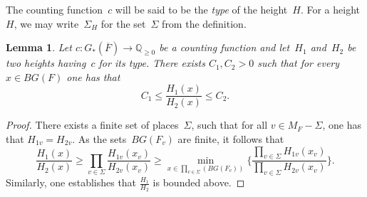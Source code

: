 \documentclass[a4paper,english,12pt]{amsart}
\newcommand{\QQ}{\mathbb{Q}}
\newtheorem{lem}[equation]{Lemma}
\numberwithin{equation}{subsection}
\begin{document}
The counting function~$c$ will be said to be the {\it type} of the height~$H$. For a height~$H$, we may write~$\Sigma_H$ for the set~$\Sigma$ from the definition.
\begin{lem}\label{boundba}
Let $c:G_*(\overline F)\to\QQ_{\geq 0}$ be a counting function and let~$H_1$ and~$H_2$ be two heights having~$c$ for its type. There exists $C_1, C_2>0$ such that for every $x\in BG(F)$ one has that $$C_1\leq \frac{H_1(x)}{H_2(x)}\leq C_2.$$
\end{lem}
\begin{proof} There exists a finite set of places~$\Sigma$, such that for all $v\in M_F-\Sigma$, one has that $H_{1v}=H_{2v}$. As the sets~$BG(F_v)$ are finite, it follows that $$\frac{H_1(x)}{H_2(x)}\geq\prod_{v\in \Sigma}\frac{H_{1v}(x_v)}{H_{2v}(x_v)}\geq \min_{x\in\prod_{v\in\Sigma}(BG(F_v))}\bigg\{\frac{\prod_{v\in\Sigma}H_{1v}(x_v)}{\prod_{v\in\Sigma}H_{2v}(x_v)}\bigg\}.$$ Similarly, one establishes that $\frac{H_1}{H_2}$ is bounded above.
\end{proof}
\end{document}
